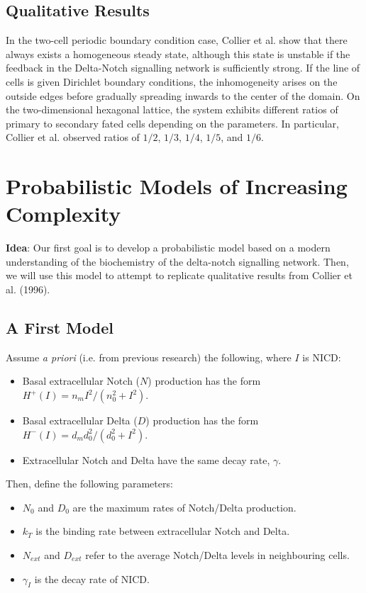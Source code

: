 \documentclass{article}
\begin{document}
\begin{flushleft}
\subsection{Qualitative Results}

In the two-cell periodic boundary condition case, Collier et al. show that there always exists a homogeneous steady state, although this state is unstable if the feedback in the Delta-Notch signalling network is sufficiently strong. If the line of cells is given Dirichlet boundary conditions, the inhomogeneity arises on the outside edges before gradually spreading inwards to the center of the domain. On the two-dimensional hexagonal lattice, the system exhibits different ratios of primary to secondary fated cells depending on the parameters. In particular, Collier et al. observed ratios of $1/2$, $1/3$, $1/4$, $1/5$, and $1/6$.

\section{Probabilistic Models of Increasing Complexity}

\textbf{Idea}: Our first goal is to develop a probabilistic model based on a modern understanding of the biochemistry of the delta-notch signalling network. Then, we will use this model to attempt to replicate qualitative results from Collier et al. (1996).

\subsection{A First Model}

Assume \emph{a priori} (i.e. from previous research) the following, where $I$ is NICD:

\begin{itemize}
  \item Basal extracellular Notch ($N$) production has the form $H^{+}(I) = n_{m}I^2/(n_{0}^2 + I^2)$. 
  \item Basal extracellular Delta ($D$) production has the form $H^{-}(I) = d_{m}d_{0}^2/(d_{0}^2 + I^2)$.
  \item Extracellular Notch and Delta have the same decay rate, $\gamma$.
\end{itemize}

Then, define the following parameters:

\begin{itemize}
  \item $N_{0}$ and $D_{0}$ are the maximum rates of Notch/Delta production.
  \item $k_{T}$ is the binding rate between extracellular Notch and Delta.
  \item $N_{ext}$ and $D_{ext}$ refer to the average Notch/Delta levels in neighbouring cells.
  \item $\gamma_{I}$ is the decay rate of NICD.
\end{itemize}


\end{flushleft}
\end{document}
